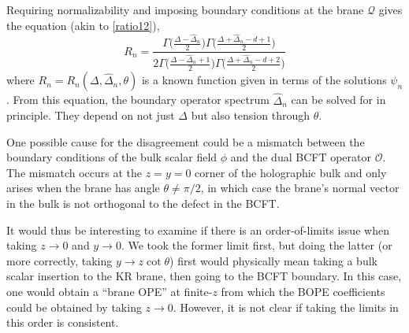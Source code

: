 \documentclass[reprint,amsmath,amssymb,aps,nofootinbib,twocolumn]{revtex4-2}
\newcommand{\jani}[1]{\textcolor{blue}{\textbf{??JK:} #1}}
\begin{document}
Requiring normalizability and imposing boundary conditions at the brane $ \mathcal{Q} $ gives the equation (akin to \eqref{ratio12}),
\begin{equation}
R_n = \frac{\Gamma\bigl(\frac{\Delta-\widehat{\Delta}_n}{2} \bigr)\Gamma\bigl(\frac{\Delta+\widehat{\Delta}_n-d+1}{2} \bigr)}{2\Gamma\bigl(\frac{\Delta-\widehat{\Delta}_n+1}{2} \bigr)\Gamma\bigl(\frac{\Delta+\widehat{\Delta}_n-d+2}{2} \bigr)}
\end{equation}
where $ R_n = R_n(\Delta,\widehat{\Delta}_n,\theta) $ is a known function given in terms of the solutions $ \psi_n $. From this equation, the boundary operator spectrum $ \widehat{\Delta}_n $ can be solved for in principle. They depend on not just $ \Delta $ but also tension through $ \theta $.

One possible cause for the disagreement could be a mismatch between the boundary conditions of the bulk scalar field $\phi$ and the dual BCFT operator $\mathcal{O}$. The mismatch occurs at the $ z = y= 0 $ corner of the holographic bulk and only arises when the brane has angle $\theta \neq \pi/2$, in which case the brane's normal vector in the bulk is not orthogonal to the defect in the BCFT. %

It would thus be interesting to examine if there is an order-of-limits issue when taking $z \to 0$ and $y \to 0$. We took the former limit first, but doing the latter (or more correctly, taking $y \to z\cot\theta$) first would physically mean taking a bulk scalar insertion to the KR brane, then going to the BCFT boundary. In this case, one would obtain a ``brane OPE'' at finite-$ z $ from which the BOPE coefficients could be obtained by taking $ z\rightarrow 0 $. However, it is not clear if taking the limits in this order is consistent.




\end{document}
